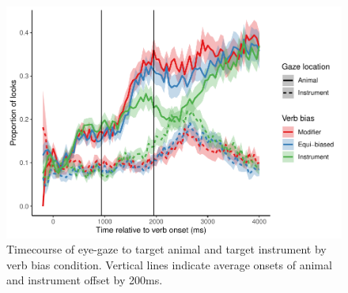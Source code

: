\documentclass[
  english,
  man,floatsintext]{apa6}
\begin{document}
\begin{figure}
\centering
\includegraphics{manuscript_files/figure-latex/E4-gaze-timecourse-fig-1.pdf}
\caption{\label{fig:E4-gaze-timecourse-fig}Timecourse of eye-gaze to target animal and target instrument by verb bias condition. Vertical lines indicate average onsets of animal and instrument offset by 200ms.}
\end{figure}
\end{document}
